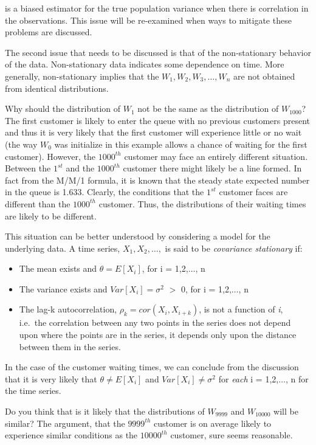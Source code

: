 \documentclass[
]{book}
\theoremstyle{definition}
\theoremstyle{definition}
\theoremstyle{definition}
\theoremstyle{definition}
\theoremstyle{remark}
\begin{document}
is a biased estimator for the true population variance when there is
correlation in the observations. This issue will be re-examined when
ways to mitigate these problems are discussed.

The second issue that needs to be discussed is that of the
non-stationary behavior of the data. Non-stationary data indicates some dependence on time. More generally, non-stationary implies that the \(W_1, W_2,W_3, \ldots, W_n\) are not
obtained from identical distributions.

Why should the distribution of \(W_1\) not be the same as the distribution
of \(W_{1000}\)? The first customer is likely to enter the queue with no
previous customers present and thus it is very likely that the first
customer will experience little or no wait (the way \(W_0\) was initialize
in this example allows a chance of waiting for the first customer).
However, the \(1000^{th}\) customer may face an entirely different
situation. Between the \(1^{st}\) and the \(1000^{th}\) customer there might
likely be a line formed. In fact from the M/M/1 formula, it is known
that the steady state expected number in the queue is 1.633. Clearly,
the conditions that the \(1^{st}\) customer faces are different than the
\(1000^{th}\) customer. Thus, the distributions of their waiting times are
likely to be different.

This situation can be better understood by considering a model for the underlying data. A time
series, \(X_1,X_2,\ldots,\) is said to be \emph{covariance stationary} if:

\begin{itemize}
\item
  The mean exists and \(\theta = E[X_i]\), for i = 1,2,\(\ldots\), n
\item
  The variance exists and \(Var[X_i] = \sigma^2\) \(>\) 0, for i =
  1,2,\(\ldots\), n
\item
  The lag-k autocorrelation, \(\rho_k = cor(X_i, X_{i+k})\), is not a
  function of \emph{i}, i.e.~the correlation between any two points in the
  series does not depend upon where the points are in the series, it
  depends only upon the distance between them in the series.
\end{itemize}

In the case of the customer waiting times, we can conclude from the
discussion that it is very likely that \(\theta \neq E[X_i]\) and
\(Var[X_i] \neq \sigma^2\) for \emph{each} i = 1,2,\(\ldots\), n for the time
series.

Do you think that is it likely that the distributions of \(W_{9999}\) and
\(W_{10000}\) will be similar? The argument, that the \(9999^{th}\) customer
is on average likely to experience similar conditions as the
\(10000^{th}\) customer, sure seems reasonable.
\end{document}
